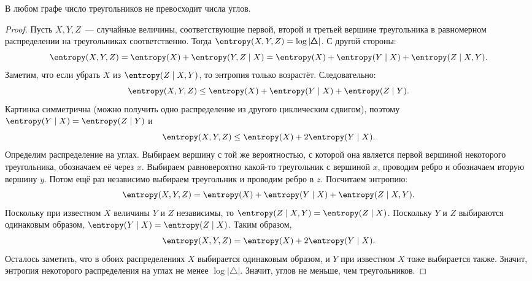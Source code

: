 \begin{theorem}[\cite{KR11}]
    В любом графе число треугольников не превосходит числа углов.
\end{theorem}
\begin{proof}
    Пусть $X, Y, Z$~--- случайные величины, соответствующие первой, второй и третьей вершине треугольника
    в равномерном распределении на треугольниках соответственно. Тогда
    $\entropy(X, Y, Z) = \log |\pmb{\triangle}|$. С другой стороны:
    $$
        \entropy(X, Y, Z) = \entropy(X) + \entropy(Y, Z \mid X) = \entropy(X) + \entropy(Y \mid X) +
        \entropy(Z \mid X, Y).
    $$
    Заметим, что если убрать $X$ из $\entropy(Z \mid X, Y)$, то энтропия только возрастёт. Следовательно:
    $$
        \entropy(X, Y, Z) \le \entropy(X) + \entropy(Y \mid X) + \entropy(Z \mid Y).
    $$
    Картинка симметрична (можно получить одно распределение из другого циклическим сдвигом), поэтому
    $\entropy(Y \mid X) = \entropy(Z \mid Y)$ и 
    $$
        \entropy(X, Y, Z) \le \entropy(X) + 2\entropy(Y \mid X).
    $$
    Определим распределение на углах. Выбираем вершину с той же вероятностью, с которой она является
    первой вершиной некоторого треугольника, обозначаем её через $x$. Выбираем равновероятно какой-то
    треугольник с вершиной $x$, проводим ребро и обозначаем вторую вершину $y$. Потом ещё раз независимо
    выбираем треугольник и проводим ребро в $z$. Посчитаем энтропию:
    $$
        \entropy(X, Y, Z) = \entropy(X) + \entropy(Y \mid X) + \entropy(Z \mid X,Y).
    $$
    Поскольку при известном $X$ величины $Y$ и $Z$ независимы, то $\entropy(Z \mid X, Y) = \entropy(Z \mid
    X)$. Поскольку $Y$ и $Z$ выбираются одинаковым образом, $\entropy(Y \mid X) = \entropy(Z \mid
    X)$. Таким образом,
    $$
    \entropy(X, Y, Z) = \entropy(X) + 2\entropy(Y \mid X).
    $$
    Осталось заметить, что в обоих распределениях $X$ выбирается одинаковым образом, и $Y$ при
    известном $X$ тоже выбирается также. Значит, энтропия некоторого распределения на углах не менее
    $\log |\pmb{\triangle}|$. Значит, углов не меньше, чем треугольников.
\end{proof}
